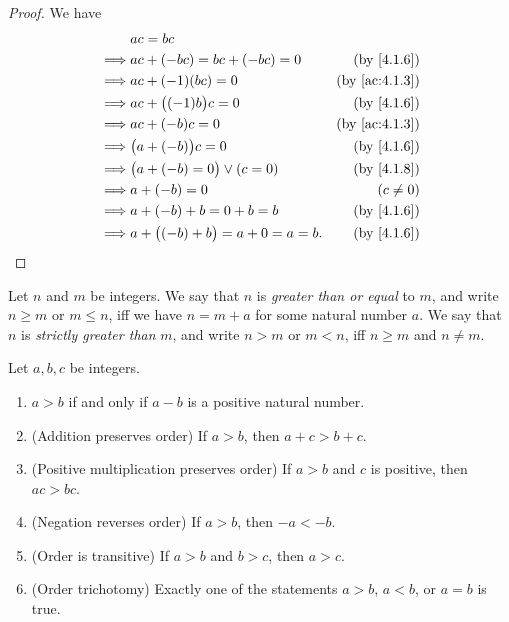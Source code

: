 \begin{proof}
  We have
  \begin{align*}
             & ac = bc                                                               \\
    \implies & ac + (-bc) = bc + (-bc) = 0             & \text{(by \cref{4.1.6})}    \\
    \implies & ac + (-1)(bc) = 0                       & \text{(by \cref{ac:4.1.3})} \\
    \implies & ac + \big((-1)b\big)c = 0               & \text{(by \cref{4.1.6})}    \\
    \implies & ac + (-b)c = 0                          & \text{(by \cref{ac:4.1.3})} \\
    \implies & \big(a + (-b)\big)c = 0                 & \text{(by \cref{4.1.6})}    \\
    \implies & \big(a + (-b) = 0\big) \lor (c = 0)     & \text{(by \cref{4.1.8})}    \\
    \implies & a + (-b) = 0                            & (c \neq 0)                  \\
    \implies & a + (-b) + b = 0 + b = b                & \text{(by \cref{4.1.6})}    \\
    \implies & a + \big((-b) + b\big) = a + 0 = a = b. & \text{(by \cref{4.1.6})}
  \end{align*}
\end{proof}

\begin{defn}\label{4.1.10}
  Let \(n\) and \(m\) be integers.
  We say that \(n\) is \emph{greater than or equal} to \(m\), and write \(n \geq m\) or \(m \leq n\), iff we have \(n = m + a\) for some natural number \(a\).
  We say that \(n\) is \emph{strictly greater than} \(m\), and write \(n > m\) or \(m < n\), iff \(n \geq m\) and \(n \neq m\).
\end{defn}

\begin{lem}\label{4.1.11}
  Let \(a, b, c\) be integers.
  \begin{enumerate}
    \item \(a > b\) if and only if \(a - b\) is a positive natural number.
    \item (Addition preserves order) If \(a > b\), then \(a + c > b + c\).
    \item (Positive multiplication preserves order) If \(a > b\) and \(c\) is positive, then \(ac > bc\).
    \item (Negation reverses order) If \(a > b\), then \(-a < -b\).
    \item (Order is transitive) If \(a > b\) and \(b > c\), then \(a > c\).
    \item (Order trichotomy) Exactly one of the statements \(a > b\), \(a < b\), or \(a = b\) is true.
  \end{enumerate}
\end{lem}

